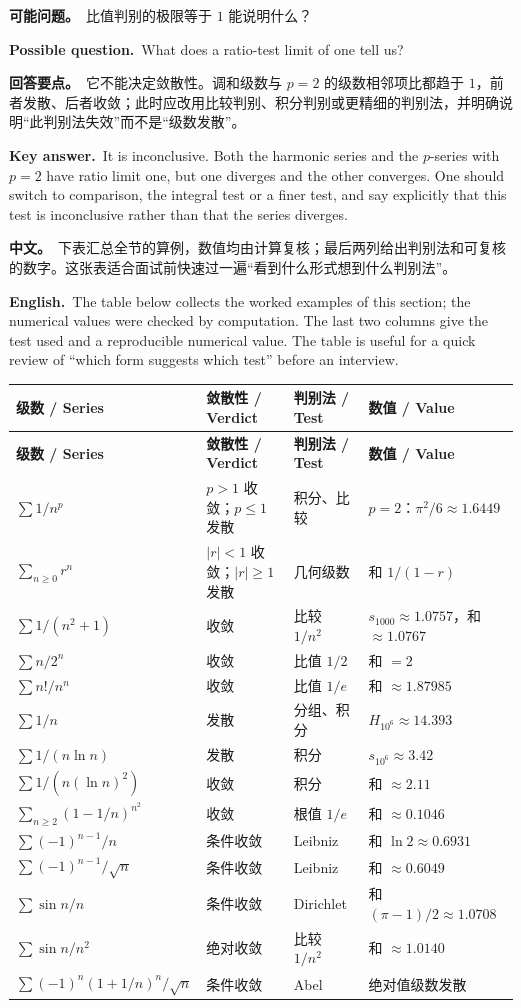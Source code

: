 \documentclass[UTF8,11pt,a4paper]{ctexart}
\newcommand{\BOTH}[2]{\par\noindent\textbf{中文。}\ #1\par\noindent\textbf{English.}\ #2\par}
\newcommand{\ASK}[4]{\begin{samepage}\par\noindent\textbf{可能问题。}\ #1\par\noindent\textbf{Possible question.}\ #2\par\noindent\textbf{回答要点。}\ #3\par\noindent\textbf{Key answer.}\ #4\medskip\end{samepage}}
\begin{document}
\ASK{比值判别的极限等于 $1$ 能说明什么？}{What does a ratio-test limit of one tell us?}{它不能决定敛散性。调和级数与 $p=2$ 的级数相邻项比都趋于 $1$，前者发散、后者收敛；此时应改用比较判别、积分判别或更精细的判别法，并明确说明“此判别法失效”而不是“级数发散”。}{It is inconclusive. Both the harmonic series and the $p$-series with $p=2$ have ratio limit one, but one diverges and the other converges. One should switch to comparison, the integral test or a finer test, and say explicitly that this test is inconclusive rather than that the series diverges.}
\BOTH{下表汇总全节的算例，数值均由计算复核；最后两列给出判别法和可复核的数字。这张表适合面试前快速过一遍“看到什么形式想到什么判别法”。}{The table below collects the worked examples of this section; the numerical values were checked by computation. The last two columns give the test used and a reproducible numerical value. The table is useful for a quick review of “which form suggests which test” before an interview.}
\begingroup\small
\begin{longtable}{@{}p{5.0cm}p{2.3cm}p{3.9cm}p{4.0cm}@{}}
\toprule
\textbf{级数 / Series} & \textbf{敛散性 / Verdict} & \textbf{判别法 / Test} & \textbf{数值 / Value}\\
\midrule
\endfirsthead
\toprule
\textbf{级数 / Series} & \textbf{敛散性 / Verdict} & \textbf{判别法 / Test} & \textbf{数值 / Value}\\
\midrule
\endhead
\bottomrule
\endlastfoot
$\sum 1/n^p$ & $p>1$ 收敛；$p\le1$ 发散 & 积分、比较 & $p=2$：$\pi^2/6\approx1.6449$\\
$\sum_{n\ge0}r^n$ & $|r|<1$ 收敛；$|r|\ge1$ 发散 & 几何级数 & 和 $1/(1-r)$\\
$\sum 1/(n^2+1)$ & 收敛 & 比较 $1/n^2$ & $s_{1000}\approx1.0757$，和 $\approx1.0767$\\
$\sum n/2^n$ & 收敛 & 比值 $1/2$ & 和 $=2$\\
$\sum n!/n^n$ & 收敛 & 比值 $1/e$ & 和 $\approx1.87985$\\
$\sum 1/n$ & 发散 & 分组、积分 & $H_{10^6}\approx14.393$\\
$\sum 1/(n\ln n)$ & 发散 & 积分 & $s_{10^6}\approx3.42$\\
$\sum 1/(n(\ln n)^2)$ & 收敛 & 积分 & 和 $\approx2.11$\\
$\sum_{n\ge2}(1-1/n)^{n^2}$ & 收敛 & 根值 $1/e$ & 和 $\approx0.1046$\\
$\sum(-1)^{n-1}/n$ & 条件收敛 & Leibniz & 和 $\ln2\approx0.6931$\\
$\sum(-1)^{n-1}/\sqrt n$ & 条件收敛 & Leibniz & 和 $\approx0.6049$\\
$\sum\sin n/n$ & 条件收敛 & Dirichlet & 和 $(\pi-1)/2\approx1.0708$\\
$\sum\sin n/n^2$ & 绝对收敛 & 比较 $1/n^2$ & 和 $\approx1.0140$\\
$\sum(-1)^n(1+1/n)^n/\sqrt n$ & 条件收敛 & Abel & 绝对值级数发散\\
\bottomrule
\end{longtable}
\endgroup
\end{document}

